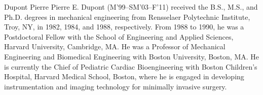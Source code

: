 \documentclass[journal]{IEEEtran}
\begin{document}
\begin{IEEEbiography}{Dupont Pierre}
Pierre E. Dupont (M’99–SM’03–F’11) received the B.S., M.S., and Ph.D. degrees in mechanical engineering from Rensselaer Polytechnic Institute, Troy, NY, in 1982, 1984, and 1988, respectively.
From 1988 to 1990, he was a Postdoctoral Fellow with the School of Engineering and Applied Sciences, Harvard University, Cambridge, MA. He was a Professor of Mechanical Engineering and Biomedical Engineering with Boston University, Boston, MA. He is currently the Chief of Pediatric Cardiac Bioengineering with Boston Children's Hospital, Harvard Medical School, Boston, where he is engaged in developing instrumentation and imaging technology for minimally invasive surgery.
\end{IEEEbiography}
\end{document}
